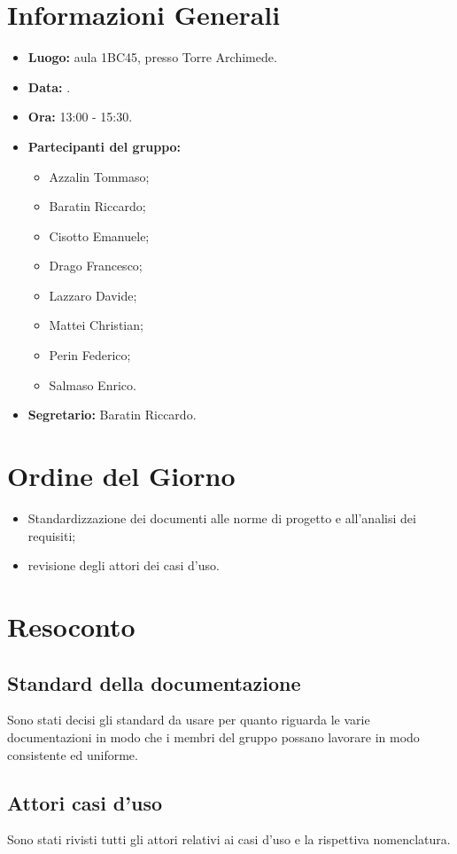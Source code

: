 \section{Informazioni Generali}
\begin{itemize}
\item \textbf{Luogo:} aula 1BC45, presso Torre Archimede.
\item \textbf{Data:} \Data.
\item \textbf{Ora:} 13:00 - 15:30.
\item \textbf{Partecipanti del gruppo:}
	\begin{itemize}
		\item Azzalin Tommaso; 
		\item Baratin Riccardo;
		\item Cisotto Emanuele; 
		\item Drago Francesco;
		\item Lazzaro Davide;
		\item Mattei Christian;
		\item Perin Federico;
		\item Salmaso Enrico.
	\end{itemize} 
\item \textbf{Segretario:} Baratin Riccardo.
\end{itemize}

\section{Ordine del Giorno}
\begin{itemize}
	\item Standardizzazione dei documenti alle norme di progetto e all'analisi dei requisiti;
	\item revisione degli attori dei casi d'uso.
\end{itemize}


\section{Resoconto}
\subsection{Standard della documentazione}
Sono stati decisi gli standard da usare per quanto riguarda le varie documentazioni in modo che i membri del gruppo possano lavorare in modo consistente ed uniforme.\\

\subsection{Attori casi d'uso}
Sono stati rivisti tutti gli attori relativi ai casi d'uso e la rispettiva nomenclatura.\\

\clearpage
